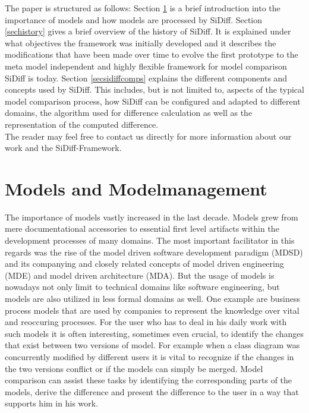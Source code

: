 \documentclass{article}
\begin{document}
The paper is structured as follows: Section \ref{secmodels} is a brief introduction into the importance of models and how models are processed by SiDiff. 
Section \ref{sechistory} gives a brief overview of the history of SiDiff. It is explained 
under what objectives the framework was initially developed and it describes the modifications that have been made over time to evolve the first prototype to the 
meta model independent and highly flexible framework for model comparison SiDiff is today. 
Section \ref{secsidiffcomps} explains the different components and concepts used by SiDiff. This includes, but is 
not limited to, aspects of the typical model comparison process, how SiDiff can be configured and adapted to different domains, 
the algorithm used for difference calculation as well as the representation of the computed difference. \\

The reader may feel free to contact us directly for more information about our work and the SiDiff-Framework. 

\section{Models and Modelmanagement}
\label{secmodels}

The importance of models vastly increased in the last decade. Models grew from mere documentational accessories to essential first level artifacts within the development processes of many 
domains. The most important facilitator in this regards was the rise of the model driven software development paradigm (MDSD) and its companying and closely related 
concepts of model driven engineering (MDE) and model driven architecture (MDA). But the usage of models is nowadays not only limit to technical domains like software engineering, but models are also utilized in 
less formal domains as well. One example are business process models that are used by companies to represent the knowledge over vital and reoccuring processes. 
For the user who has to deal in his daily work with such models it is often interesting, sometimes even crucial, to identify the changes 
that exist between two versions of model. For example when a class diagram was concurrently modified by different users it is vital to recognize if the changes in the two versions conflict or if the models can simply be merged. Model comparison can assist these tasks by identifying the corresponding parts of the models, derive the difference and present the difference to the user in a way that supports him in his work. \\
\end{document}

